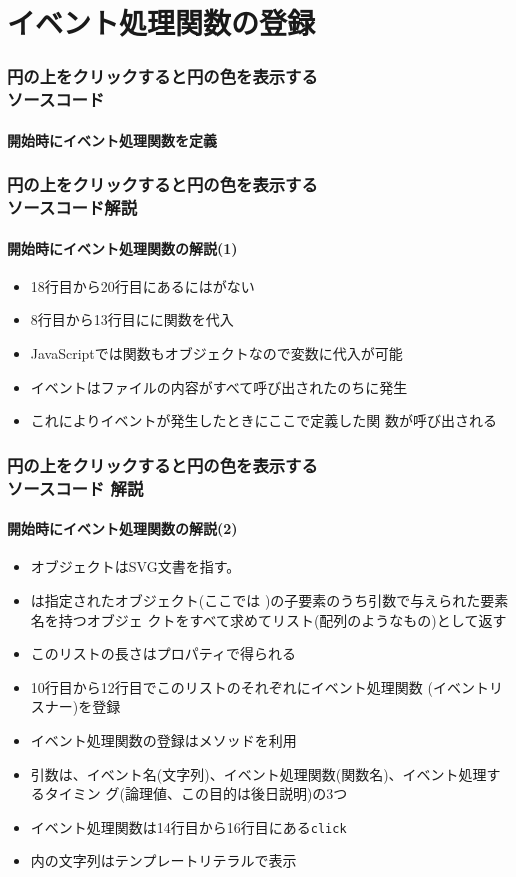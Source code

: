 \section{イベント処理関数の登録}
\begin{frame}[containsverbatim]
 \frametitle{円の上をクリックすると円の色を表示する\\ソースコード}
  \framesubtitle{開始時にイベント処理関数を定義}
\end{frame}
\begin{frame}[containsverbatim]
 \frametitle{円の上をクリックすると円の色を表示する\\ソースコード解説}
  \framesubtitle{開始時にイベント処理関数の解説(1)}
 \begin{itemize}
  \item 18行目から20行目にあるにはがない
  \item 8行目から13行目にに関数を代入
  \item JavaScriptでは関数もオブジェクトなので変数に代入が可能
  \item {}イベントはファイルの内容がすべて呼び出されたのちに発生
  \item これによりイベントが発生したときにここで定義した関
        数が呼び出される
 \end{itemize}
\end{frame}
\begin{frame}[containsverbatim]
 \frametitle{円の上をクリックすると円の色を表示する\\ソースコード
 解説}
  \framesubtitle{開始時にイベント処理関数の解説(2)}
\begin{itemize}
 \item {}オブジェクトはSVG文書を指す。
 \item {}は指定されたオブジェクト(ここでは
       )の子要素のうち引数で与えられた要素名を持つオブジェ
       クトをすべて求めてリスト(配列のようなもの)として返す
 \item このリストの長さはプロパティで得られる
 \item 10行目から12行目でこのリストのそれぞれにイベント処理関数
       (イベントリスナー)を登録
 \item イベント処理関数の登録はメソッドを利用
 \item 引数は、イベント名(文字列)、イベント処理関数(関数名)、イベント処理するタイミン
       グ(論理値、この目的は後日説明)の3つ
 \item イベント処理関数は14行目から16行目にある\texttt{click}
 \item {}内の文字列はテンプレートリテラルで表示
\end{itemize}
\end{frame}

